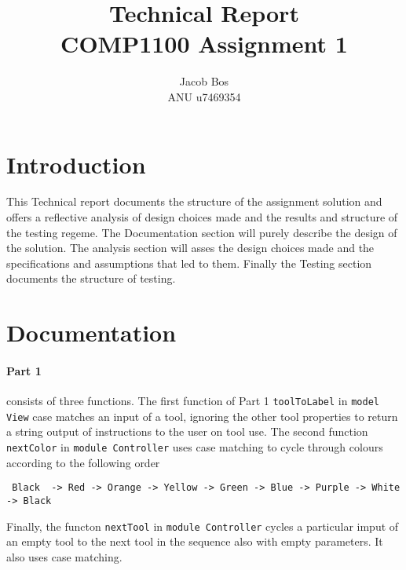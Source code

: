 \documentclass[11pt]{article}
\title{Technical Report\\ COMP1100 Assignment 1}
\author{Jacob Bos\\ ANU u7469354}
\begin{document}
\maketitle
\section*{Introduction} 
This Technical report documents the structure of the assignment solution and offers a reflective analysis of design choices made and the results and structure of the testing regeme. The Documentation section will purely describe the design of the solution. The analysis section will asses the design choices made and the specifications and assumptions that led to them. Finally the Testing section documents the structure of testing. 


\section*{Documentation}%
\paragraph{Part 1} consists of three functions. The first function of Part 1 \verb|toolToLabel| in \verb|model View| case matches an input of a tool, ignoring the other tool properties to return a string output of instructions to the user on tool use. The second function \verb|nextColor| in \verb|module Controller| uses case matching to cycle through colours according to the following order

\begin{verbatim} Black  -> Red -> Orange -> Yellow -> Green -> Blue -> Purple -> White -> Black\end{verbatim}

Finally, the functon \verb|nextTool| in \verb|module Controller| cycles a particular imput of an empty tool to the next tool in the sequence also with empty parameters. It also uses case matching.
\end{document}
